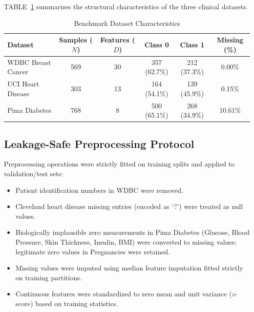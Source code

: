 \documentclass[conference]{IEEEtran}
\begin{document}
TABLE~\ref{tab:datasets} summarizes the structural characteristics of the three clinical datasets.

\begin{table}[htbp]
\caption{Benchmark Dataset Characteristics}
\label{tab:datasets}
\centering
\begin{tabular}{lccccc}
\toprule
Dataset & Samples ($N$) & Features ($D$) & Class 0 & Class 1 & Missing (\%) \\
\midrule
WDBC Breast Cancer & 569 & 30 & 357 (62.7\%) & 212 (37.3\%) & 0.00\% \\
UCI Heart Disease & 303 & 13 & 164 (54.1\%) & 139 (45.9\%) & 0.15\% \\
Pima Diabetes & 768 & 8 & 500 (65.1\%) & 268 (34.9\%) & 10.61\% \\
\bottomrule
\end{tabular}
\end{table}

\subsection{Leakage-Safe Preprocessing Protocol}
Preprocessing operations were strictly fitted on training splits and applied to validation/test sets:
\begin{itemize}
    \item Patient identification numbers in WDBC were removed.
    \item Cleveland heart disease missing entries (encoded as `?') were treated as null values.
    \item Biologically implausible zero measurements in Pima Diabetes (Glucose, Blood Pressure, Skin Thickness, Insulin, BMI) were converted to missing values; legitimate zero values in Pregnancies were retained.
    \item Missing values were imputed using median feature imputation fitted strictly on training partitions.
    \item Continuous features were standardized to zero mean and unit variance ($z$-score) based on training statistics.
\end{itemize}
\end{document}
